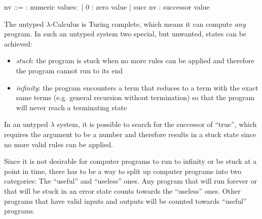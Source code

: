 \begin{bnfgrammar}
    nv ::= : numeric values$\colon$
    | 0 : zero value
    | succ nv : successor value
\end{bnfgrammar}

The untyped $\lambda$-Calculus is Turing complete,
which means it can compute \textit{any} program.
In such an untyped system two special, but unwanted, states can be achieved:

\begin{itemize}
    \item \textit{stuck}: the program is stuck when no more
          rules can be applied and therefore the program
          cannot run to its end
    \item \textit{infinity}: the program encounters a term that
          reduces to a term with the exact same terms
          (e.g. general recursion without termination)
          so that the program will never reach a terminating
          state
\end{itemize}

In an untyped $\lambda$ system, it is possible to search
for the successor of ``true'', which
requires the argument to be a number and therefore
results in a stuck state since no more valid rules
can be applied.

Since it is not desirable for computer programs to run to infinity or be stuck at a point in time,
there has to be a way to split up computer programs into two categories:
The ``useful'' and ``useless'' ones. Any program that will run forever
or that will be stuck in an error state counts towards the ``useless'' ones.
Other programs that have valid inputs and outputs will be counted towards ``useful''
programs.

